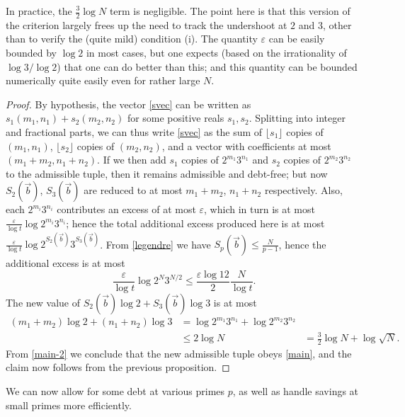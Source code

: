 \documentclass[12pt,a4paper,reqno]{amsart}
\numberwithin{equation}{section}
\theoremstyle{plain}
\theoremstyle{definition}
\newcommand\eps{\varepsilon}
\begin{document}
In practice, the $\frac{3}{2} \log N$ term is negligible. The point here is that this version of the criterion largely frees up the need to track the undershoot at $2$ and $3$, other than to verify the (quite mild) condition (i).  The quantity $\eps$ can be easily bounded by $\log 2$ in most cases, but one expects (based on the irrationality of $\log 3/\log 2$) that one can do better than this; and this quantity can be bounded numerically quite easily even for rather large $N$.

\begin{proof}  By hypothesis, the vector \eqref{svec} can be written as $s_1 (m_1,n_1) + s_2 (m_2,n_2)$ for some positive reals $s_1,s_2$.  Splitting into integer and fractional parts, we can thus write \eqref{svec} as the sum of $\lfloor s_1 \rfloor$ copies of $(m_1,n_1)$, $\lfloor s_2 \rfloor$ copies of $(m_2,n_2)$, and a vector with coefficients at most $(m_1+m_2, n_1+n_2)$.  If we then add $s_1$ copies of $2^{m_1} 3^{n_1}$ and $s_2$ copies of  $2^{m_2} 3^{n_2}$ to the admissible tuple, then it remains admissible and debt-free; but now $S_2(\vec b)$, $S_3(\vec b)$ are reduced to at most $m_1+m_2$, $n_1+n_2$ respectively.  Also, each $2^{m_i} 3^{n_i}$ contributes an excess of at most $\eps$, which in turn is at most $\frac{\eps}{\log t} \log 2^{m_i} 3^{n_i}$; hence the total additional excess produced here is at most $\frac{\eps}{\log t} \log 2^{S_2(\vec b)} 3^{S_3(\vec b)}$.  From \eqref{legendre} we have $S_p(\vec b) \leq \frac{N}{p-1}$, hence the additional excess is at most
$$ \frac{\eps}{\log t} \log 2^{N} 3^{N/2} \leq \frac{\eps \log 12}{2} \frac{N}{\log t}.$$
The new value of $S_2(\vec b) \log 2 + S_3(\vec b) \log 3$
is at most
\begin{align*}
  (m_1+m_2) \log 2 + (n_1+n_2)\log 3 &= \log 2^{m_1} 3^{n_1} + \log 2^{m_2} 3^{n_2} \\
  &\leq 2 \log N
  &= \frac{3}{2} \log N + \log \sqrt{N}.
\end{align*}
From \eqref{main-2} we conclude that the new admissible tuple obeys \eqref{main}, and the claim now follows from the previous proposition.  
\end{proof}

We can now allow for some debt at various primes $p$, as well as handle savings at small primes more efficiently.
\end{document}
